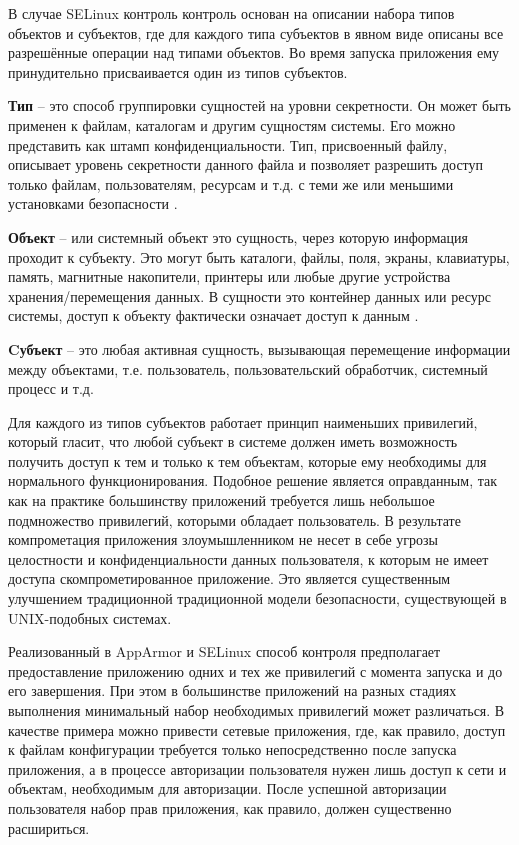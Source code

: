 В случае SELinux контроль контроль основан на
описании набора типов объектов и субъектов, где для
каждого типа субъектов в явном виде описаны все разрешённые
операции над типами объектов. Во время запуска приложения
ему принудительно присваивается один из типов субъектов.

\textbf{Тип} -- это способ группировки сущностей на уровни
        секретности. Он может быть применен к файлам,
        каталогам и другим сущностям системы. Его можно
        представить как штамп конфиденциальности.
        Тип, присвоенный файлу, описывает уровень
        секретности данного файла и позволяет разрешить
        доступ только файлам, пользователям, ресурсам и т.д.
        с теми же или меньшими установками безопасности \cite{selinux2}.

\textbf{Объект} -- или системный объект это сущность,
        через которую информация проходит к субъекту.
        Это могут быть каталоги, файлы, поля, экраны,
        клавиатуры, память, магнитные накопители,
        принтеры или любые другие устройства хранения/перемещения
        данных. В сущности это контейнер данных или ресурс
        системы, доступ к объекту фактически означает доступ к данным \cite{selinux2}.

\textbf{Cубъект} -- это любая активная сущность, вызывающая
        перемещение информации между объектами, т.е.
        пользователь, пользовательский обработчик,
        системный процесс и т.д. \cite{selinux2}

Для каждого из типов субъектов работает принцип наименьших
привилегий, который гласит, что любой субъект в системе
должен иметь возможность получить доступ к тем и только к
тем объектам, которые ему необходимы для нормального
функционирования. Подобное решение является оправданным,
так как на практике большинству приложений требуется лишь
небольшое подмножество привилегий, которыми обладает
пользователь. В результате компрометация приложения
злоумышленником не несет в себе угрозы целостности
и конфиденциальности данных пользователя, к которым не
имеет доступа скомпрометированное приложение. Это является
существенным улучшением традиционной традиционной
модели безопасности, существующей в UNIX-подобных системах.

Реализованный в AppArmor и SELinux способ контроля предполагает
предоставление приложению одних и тех же привилегий с момента
запуска и до его завершения. При этом в большинстве приложений
на разных стадиях выполнения минимальный набор необходимых
привилегий может различаться. В качестве примера можно привести
сетевые приложения, где, как правило, доступ к файлам конфигурации
требуется только непосредственно после запуска приложения,
а в процессе авторизации пользователя нужен лишь доступ к сети и
объектам, необходимым для авторизации. После успешной авторизации
пользователя набор прав приложения, как правило, должен существенно
расшириться.

